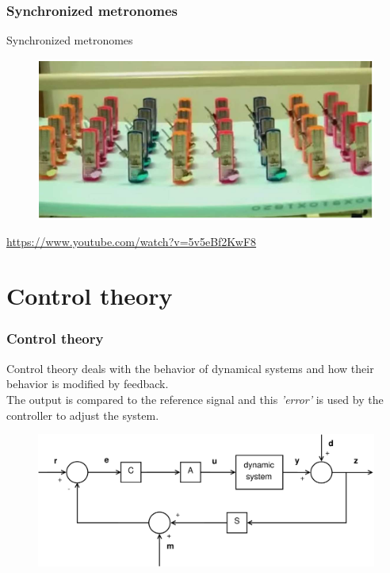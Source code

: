 \begin{frame}
	\frametitle{Synchronized metronomes}
	Synchronized metronomes
	\begin{figure}
		\includegraphics[scale=0.8]{synchronized_metronomes}
	\end{figure}
	\url{https://www.youtube.com/watch?v=5v5eBf2KwF8}
\end{frame}

\section{Control theory}

\begin{frame}
	\frametitle{Control theory}
	Control theory deals with the behavior of dynamical systems and how their behavior is modified by feedback.\\
	The output is compared to the reference signal and this \textit{'error'} is used by the controller to adjust the system. 
	\medskip
	\begin{figure}
		\includegraphics[width=1\linewidth]{full_system1}
	\end{figure}
\end{frame}

